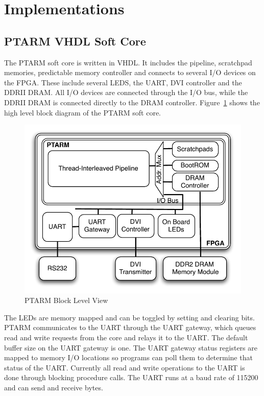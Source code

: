 \section{Implementations}
\subsection{PTARM VHDL Soft Core}
\label{sec:ptarm_vhdl_soft_core}
  
The PTARM soft core is written in VHDL.
It includes the pipeline, scratchpad memories, predictable memory controller and connects to several I/O devices on the FPGA.
These include several LEDS, the UART, DVI controller and the DDRII DRAM.
All I/O devices are connected through the I/O bus, while the DDRII DRAM is connected directly to the DRAM controller.
Figure~\ref{fig:ptarm_vhdl_high_level} shows the high level block diagram of the PTARM soft core.

\begin{figure}
  \vspace{-20pt}
  \begin{center}
    \includegraphics[scale=.6]{figs/ptarm_vhdl_high_level}
  \end{center}
  \vspace{-3mm}
  \caption{PTARM Block Level View}
  \label{fig:ptarm_vhdl_high_level}
  \vspace{-10pt}
\end{figure} 

The LEDs are memory mapped and can be toggled by setting and clearing bits.
PTARM communicates to the UART through the UART gateway, which queues read and write requests from the core and relays it to the UART.
The default buffer size on the UART gateway is one.
The UART gateway status registers are mapped to memory I/O locations so programs can poll them to determine that status of the UART.  
Currently all read and write operations to the UART is done through blocking procedure calls. 
The UART runs at a baud rate of 115200 and can send and receive bytes.


